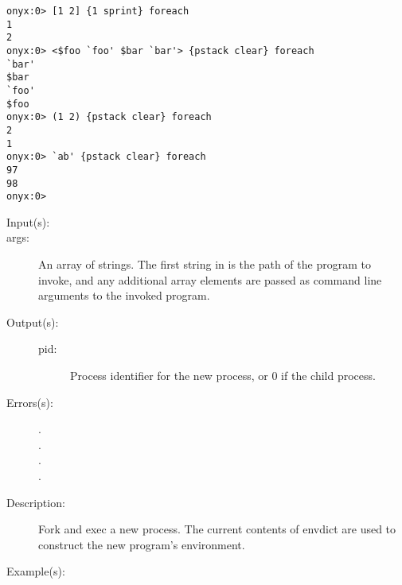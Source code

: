 \begin{description}
\begin{description}
\begin{verbatim}
onyx:0> [1 2] {1 sprint} foreach
1
2
onyx:0> <$foo `foo' $bar `bar'> {pstack clear} foreach
`bar'
$bar
`foo'
$foo
onyx:0> (1 2) {pstack clear} foreach
2
1
onyx:0> `ab' {pstack clear} foreach
97
98
onyx:0>
		\end{verbatim}
	\end{description}
\label{systemdict:forkexec}
\item[{\onyxop{args}{forkexec}{pid}}: ]
	\begin{description}\item[]
	\item[Input(s): ]
		\item[args: ]
			An array of strings.  The first string in 
			is the path of the program to invoke, and any additional
			array elements are passed as command line arguments to
			the invoked program.
	\item[Output(s): ]
		\begin{description}\item[]
		\item[pid: ]
			Process identifier for the new process, or 0 if the
			child process.
		\end{description}
	\item[Errors(s): ]
		\begin{description}\item[]
		\item[.]
		\item[.]
		\item[.]
		\item[.]
		\end{description}
	\item[Description: ]
		Fork and exec a new process.  The current contents of envdict
		are used to construct the new program's environment.
	\item[Example(s): ]\begin{verbatim}


\end{verbatim}
\end{description}
\end{description}
